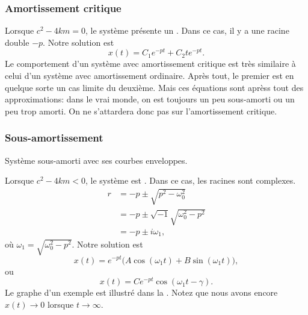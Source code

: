 \subsubsection{Amortissement critique}

Lorsque $c^2 - 4km = 0$, le système présente un \emph{}.  
Dans ce cas, il y a une racine double  $-p$.  Notre solution est 
\begin{equation*}
	x(t) = C_1 e^{-pt} + C_2 t e^{-pt} .
\end{equation*}
Le comportement d'un système avec amortissement critique est très similaire à celui d'un système avec amortissement ordinaire. Après tout, le premier est en quelque sorte un cas limite du deuxième.  
Mais ces équations sont aprèss tout des approximations: dans le vrai monde, 
on est toujours un peu sous-amorti ou un peu trop amorti. 
On ne s'attardera donc pas sur l'amortissement critique.

\subsubsection{Sous-amortissement}

\begin{mywrapfig}[13]{3.25in}
\capstart {}
\caption{Système sous-amorti avec ses courbes enveloppes.\label{mv:underdampedfig}}
\end{mywrapfig}
%
%
Lorsque $c^2 - 4km < 0$, le système est \emph{}. 
Dans ce cas, les racines sont complexes. 
\begin{align*}
	r & = -p \pm \sqrt{p^2 - \omega_0^2} \\
	  & = -p \pm \sqrt{-1}\sqrt{\omega_0^2 - p^2} \\
	  & = -p \pm i \omega_1 ,
\end{align*}
où $\omega_1 =\sqrt{\omega_0^2 - p^2}$.  Notre solution est
\begin{equation*}
	x(t) = e^{-pt} \bigl( A \cos (\omega_1 t) + B \sin (\omega_1 t) \bigr) ,
\end{equation*}
ou
\begin{equation*}
	x(t) = C e^{-pt} \cos ( \omega_1 t - \gamma ) .
\end{equation*}
Le graphe d'un exemple est illustré dans la  .  
Notez que nous avons encore $x(t) \to 0$ lorsque $t \to \infty$.

